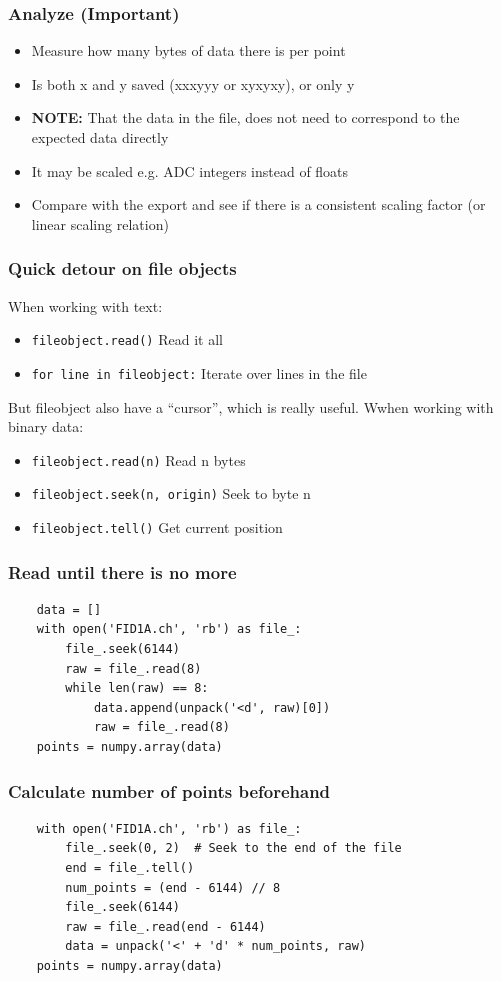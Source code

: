 \documentclass{beamer}
\begin{document}
\begin{frame}
  \frametitle{Analyze (Important)}
  \begin{itemize}
  \item Measure how many bytes of data there is per point
  \item Is both x and y saved (xxxyyy or xyxyxy), or only y
  \item \textbf{NOTE:} That the data in the file, does not need to
    correspond to the expected data directly
  \item It may be scaled e.g. ADC integers instead of floats
  \item Compare with the export and see if there is a consistent
    scaling factor (or linear scaling relation)
  \end{itemize}
\end{frame}

\begin{frame}
  \frametitle{Quick detour on file objects}
  When working with text:
  \begin{itemize}
  \item \texttt{fileobject.read()}    Read it all
  \item \texttt{for line in fileobject:}    Iterate over lines in the file
  \end{itemize}
  But fileobject also have a ``cursor'', which is really useful. Wwhen
  working with binary data:
  \begin{itemize}
  \item \texttt{fileobject.read(n)}    Read n bytes
  \item \texttt{fileobject.seek(n, origin)}    Seek to byte n
  \item \texttt{fileobject.tell()}    Get current position
  \end{itemize}
\end{frame}

\begin{frame}[fragile]
  \frametitle{Read until there is no more}
  \begin{verbatim}
    data = []
    with open('FID1A.ch', 'rb') as file_:
        file_.seek(6144)
        raw = file_.read(8)
        while len(raw) == 8:
            data.append(unpack('<d', raw)[0])
            raw = file_.read(8)
    points = numpy.array(data)    
  \end{verbatim}
\end{frame}

\begin{frame}[fragile]
  \frametitle{Calculate number of points beforehand}
  \begin{verbatim}
    with open('FID1A.ch', 'rb') as file_:
        file_.seek(0, 2)  # Seek to the end of the file
        end = file_.tell()
        num_points = (end - 6144) // 8
        file_.seek(6144)
        raw = file_.read(end - 6144)
        data = unpack('<' + 'd' * num_points, raw)
    points = numpy.array(data)
  \end{verbatim}
\end{frame}
\end{document}

